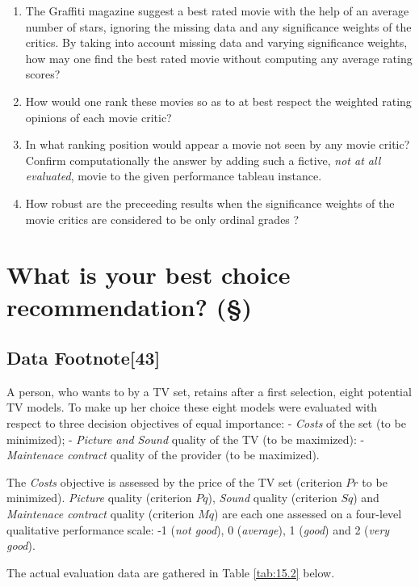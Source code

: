 \begin{enumerate}
\item The Graffiti magazine suggest a best rated movie with the help of an average number of stars, ignoring the missing data and any significance weights of the critics. By taking into account missing data and varying significance weights, how may one find the best rated movie without computing any average rating scores?
\item How would one rank these movies so as to at best respect the weighted rating opinions of each movie critic?
\item In what ranking position would appear a movie not seen by any movie critic? Confirm computationally the answer by adding such a fictive, \emph{not at all evaluated}, movie to the given performance tableau instance.
\item How robust are the preceeding results when the significance weights of the movie critics are considered to be only ordinal grades ?
\end{enumerate}

\section{What is your best choice recommendation? (§)}
\label{sec:15.3}


\subsection{Data Footnote[43]}
\label{sec:15.3.1}

A person, who wants to by a TV set, retains after a first selection, eight potential TV models. To make up her choice these eight models were evaluated with respect to three decision objectives of equal importance: - \emph{Costs} of the set (to be minimized); - \emph{Picture and Sound} quality of the TV (to be maximized): - \emph{Maintenace contract} quality of the provider (to be maximized).

The \emph{Costs} objective is assessed by the price of the TV set (criterion $Pr$ to be minimized). \emph{Picture} quality (criterion $Pq$), \emph{Sound} quality (criterion $Sq$) and \emph{Maintenace contract} quality (criterion $Mq$) are each one assessed on a four-level qualitative performance scale: -1 (\emph{not good}), 0 (\emph{average}), 1 (\emph{good}) and 2 (\emph{very good}).

The actual evaluation data are gathered in Table \ref{tab:15.2} below.    

